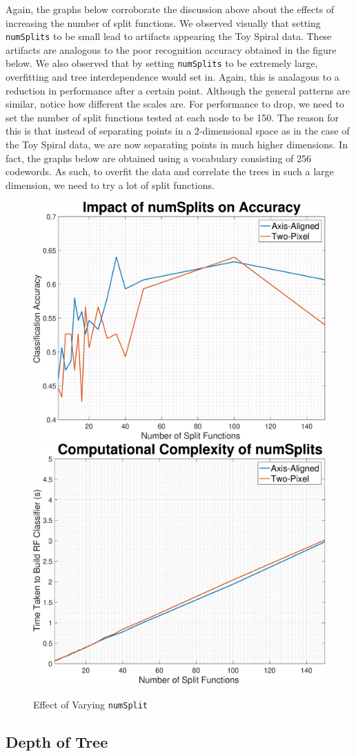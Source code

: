 \documentclass[a4paper,pra,twocolumn,10pt,aps,longbibliography,nobalancelastpage]{article}
\begin{document}
Again, the graphs below corroborate the discussion above about the effects of increasing the number of split functions. We observed visually that setting \texttt{numSplits} to be small lead to artifacts appearing the Toy Spiral data. These artifacts are analogous to the poor recognition accuracy obtained in the figure below. We also observed that by setting \texttt{numSplits} to be extremely large, overfitting and tree interdependence would set in. Again, this is analagous to a reduction in performance after a certain point. Although the general patterns are similar, notice how different the scales are. For performance to drop, we need to set the number of split functions tested at each node to be 150. The reason for this is that instead of separating points in a 2-dimensional space as in the case of the Toy Spiral data, we are now separating points in much higher dimensions. In fact, the graphs below are obtained using a vocabulary consisting of 256 codewords. As such, to overfit the data and correlate the trees in such a large dimension, we need to try a lot of split functions. 

\begin{figure}[H]
	\centering
    \includegraphics[width=0.49\columnwidth]{numSplits_acc}
	\includegraphics[width=0.49\columnwidth]{numSplits_complexity}
    \caption{Effect of Varying \texttt{numSplit}}
\end{figure}

\subsection*{Depth of Tree}
\end{document}
